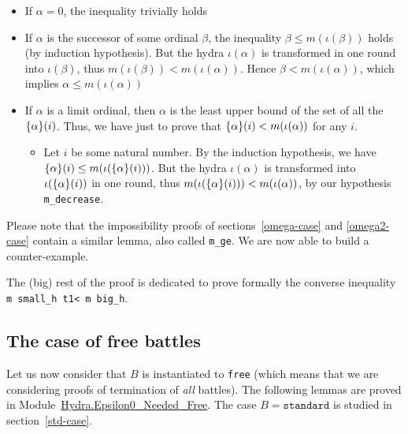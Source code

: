 

\begin{itemize}
\item If $\alpha=0$, the inequality trivially holds
\item If $\alpha$ is the successor of  some ordinal $\beta$, the inequality $\beta \leq m(\iota(\beta))$ holds (by induction hypothesis). But the hydra $\iota(\alpha)$ is transformed in one round into 
$\iota(\beta)$, thus $m(\iota(\beta))<m(\iota(\alpha))$. Hence $\beta<m(\iota(\alpha))$, which implies $\alpha \leq m(\iota(\alpha))$
\item If $\alpha$ is a limit ordinal, then $\alpha$ is the least upper bound of the set
of all  the $\mbox{$\{\alpha\}(i)$}$.  Thus, we have just to prove that $\mbox{$\{\alpha\}(i)$}< m(\iota(\alpha))$ for any $i$. 
\begin{itemize}
\item Let $i$ be some natural number.
By the induction hypothesis, we have $\mbox{$\{\alpha\}(i)$} \leq m(\iota(\mbox{$\{\alpha\}(i)$}))$. But the hydra $\iota(\alpha)$ is transformed into $\iota(\mbox{$\{\alpha\}(i)$})$ in one round, thus $m(\iota(\mbox{$\{\alpha\}(i)$})) < m(\iota(\alpha))$, by our hypothesis \texttt{m\_decrease}.
\end{itemize}
\end{itemize}

Please note that the impossibility proofs of 
sections~\vref{omega-case} and \vref{omega2-case} contain a similar lemma, also called \texttt{m\_ge}.
We are now able to build a counter-example.



The (big) rest of the proof is dedicated to prove formally the converse inequality 
\texttt{m small\_h t1< m big\_h}. 

\subsection{The case of free battles}
\label{sec:free-battles-case}
Let us now consider that $B$ is instantiated to \texttt{free} (which means that we are considering proofs of termination of \emph{all} battles). The following lemmas are proved in Module~\href{../theories/html/hydras.Hydra.Epsilon0_Needed_Free.html}{Hydra.Epsilon0\_Needed\_Free}.
The case $B=\texttt{standard}$ is studied in section~\vref{std-case}.





